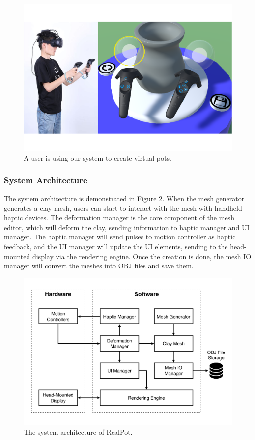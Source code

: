 \documentclass{svjour3}                     %
\begin{document}
\begin{figure}
\includegraphics[width=\textwidth]{fig1}
\caption{A user is using our system to create virtual pots.}
\label{fig:demo}
\end{figure}

\subsubsection{System Architecture}
\label{sec:architecture}

The system architecture is demonstrated in Figure \ref{fig:arc}. When the mesh generator generates a clay mesh, users can start to interact with the mesh with handheld haptic devices. The deformation manager is the core component of the mesh editor, which will deform the clay, sending information to haptic manager and UI manager. The haptic manager will send pulses to motion controller as haptic feedback, and the UI manager will update the UI elements, sending to the head-mounted display via the rendering engine. Once the creation is done, the mesh IO manager will convert the meshes into OBJ files and save them.

\begin{figure}
\includegraphics[width=\textwidth]{fig2}
\caption{The system architecture of RealPot.}
\label{fig:arc}
\end{figure}
\end{document}
